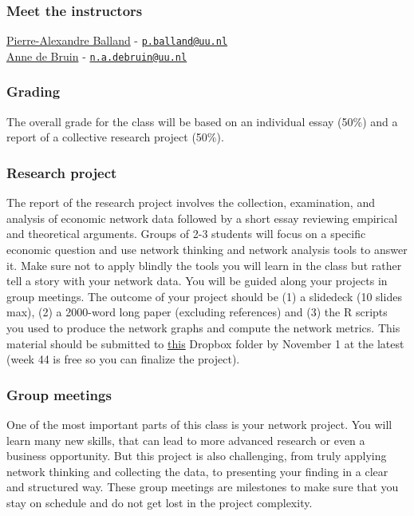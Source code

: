 \documentclass[
]{article}
\begin{document}
\hypertarget{meet-the-instructors}{%
\subsubsection{Meet the instructors}\label{meet-the-instructors}}

\href{https://www.paballand.com/}{Pierre-Alexandre Balland} -
\href{mailto:p.balland@uu.nl}{\nolinkurl{p.balland@uu.nl}}\\
\href{n.a.debruin@uu.nl}{Anne de Bruin} -
\href{mailto:n.a.debruin@uu.nl}{\nolinkurl{n.a.debruin@uu.nl}}

\hypertarget{grading}{%
\subsubsection{Grading}\label{grading}}

The overall grade for the class will be based on an individual essay
(50\%) and a report of a collective research project (50\%).

\hypertarget{research-project}{%
\subsubsection{Research project}\label{research-project}}

The report of the research project involves the collection, examination,
and analysis of economic network data followed by a short essay
reviewing empirical and theoretical arguments. Groups of 2-3 students
will focus on a specific economic question and use network thinking and
network analysis tools to answer it. Make sure not to apply blindly the
tools you will learn in the class but rather tell a story with your
network data. You will be guided along your projects in group meetings.
The outcome of your project should be (1) a slidedeck (10 slides max),
(2) a 2000-word long paper (excluding references) and (3) the R scripts
you used to produce the network graphs and compute the network metrics.
This material should be submitted to
\href{https://www.dropbox.com/request/LwSV7hxd0i4qTatae9hZ}{this}
Dropbox folder by November 1 at the latest (week 44 is free so you can
finalize the project).

\hypertarget{group-meetings}{%
\subsubsection{Group meetings}\label{group-meetings}}

One of the most important parts of this class is your network project.
You will learn many new skills, that can lead to more advanced research
or even a business opportunity. But this project is also challenging,
from truly applying network thinking and collecting the data, to
presenting your finding in a clear and structured way. These group
meetings are milestones to make sure that you stay on schedule and do
not get lost in the project complexity.
\end{document}
